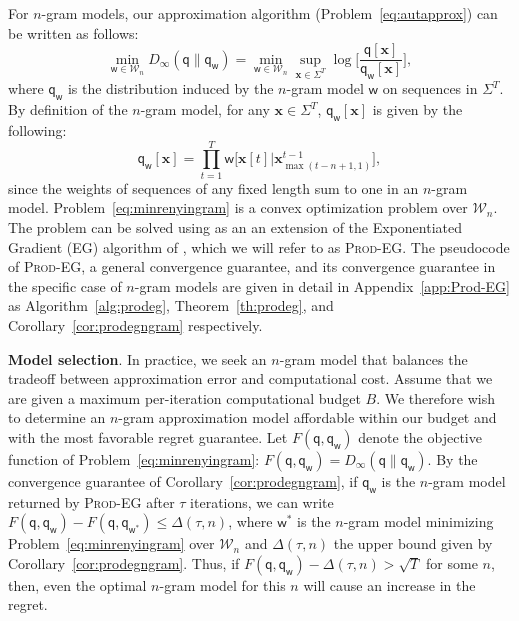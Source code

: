 \documentclass{article}
\newcommand{\bx}{{\mathbf x}}
\newcommand{\sfq}{{\mathsf q}}
\newcommand{\sfw}{{\mathsf w}}
\newcommand{\cW}{\mathcal W}
\begin{document}
For $n$-gram models, our approximation algorithm
(Problem~\ref{eq:autapprox}) can be written as follows:
\begin{equation}
\label{eq:minrenyingram}
\min_{\sfw \in \cW_n} D_\infty(\sfq \| \sfq_{\sfw})
=  \min_{\sfw \in \cW_n} \sup_{\bx \in \Sigma^T} 
\log\bigg[ \frac{\sfq[\bx]}{\sfq_{\sfw}[\bx]} \bigg],
\end{equation}
where $\sfq_{\sfw}$ is the distribution induced by the $n$-gram model
$\sfw$ on sequences in $\Sigma^T$. By definition of the $n$-gram
model, for any $\bx \in \Sigma^T$, $\sfq_{\sfw}[\bx]$ is given by the
following:
\begin{equation*}
\sfq_{\sfw}[\bx] = \prod_{t = 1}^T \sfw \big[\bx[t] \big| \bx_{\max(t - n +
  1, 1)}^{t - 1} \big],
\end{equation*}
since the weights of sequences of any fixed
length sum to one in an $n$-gram model. Problem~\ref{eq:minrenyingram} is a convex
optimization problem over $\cW_n$. The problem can be solved
using as an an extension of the Exponentiated Gradient (EG) algorithm
of \cite{KivinenWarmuth1997}, which we will refer to as
\textsc{Prod-EG}. The pseudocode of \textsc{Prod-EG}, a general convergence
guarantee, and its convergence guarantee in
the specific case of $n$-gram models are given in detail in
Appendix~\ref{app:Prod-EG} as Algorithm~\ref{alg:prodeg}, Theorem~\ref{th:prodeg},
and Corollary~\ref{cor:prodegngram} respectively.

{\bf Model selection}. In practice, we seek an $n$-gram model that
balances the tradeoff between approximation error and computational
cost. Assume that we are given a maximum per-iteration computational
budget $B$. We therefore wish to determine an $n$-gram approximation
model affordable within our budget and with the most favorable regret
guarantee.  Let $F(\sfq, \sfq_\sfw)$ denote the objective function of
Problem~\eqref{eq:minrenyingram}:
$F(\sfq, \sfq_\sfw) = D_\infty(\sfq \| \sfq_{\sfw})$.  By the
convergence guarantee of Corollary~\ref{cor:prodegngram}, if
$\sfq_\sfw$ is the $n$-gram model returned by \textsc{Prod-EG} after
$\tau$ iterations, we can write
$F(\sfq, \sfq_\sfw) - F(\sfq, \sfq_{\sfw^*}) \leq \Delta(\tau, n)$,
where $\sfw^*$ is the $n$-gram model minimizing
Problem~\eqref{eq:minrenyingram} over $\cW_n$ and $\Delta(\tau, n)$
the upper bound given by Corollary~\ref{cor:prodegngram}.  Thus, if
$F(\sfq, \sfq_\sfw) - \Delta(\tau, n) > \sqrt{T}$ for some $n$, then,
even the optimal $n$-gram model for this $n$ will cause an increase in
the regret.
\end{document}
